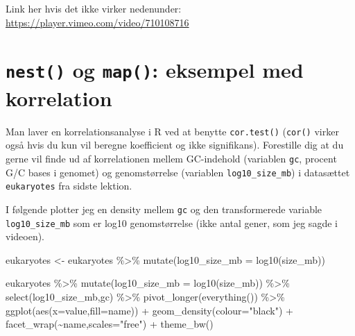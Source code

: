 \documentclass[
]{book}
\newenvironment{Shaded}{\begin{snugshade}}{\end{snugshade}}
\newcommand{\AttributeTok}[1]{\textcolor[rgb]{0.77,0.63,0.00}{#1}}
\newcommand{\FunctionTok}[1]{\textcolor[rgb]{0.00,0.00,0.00}{#1}}
\newcommand{\NormalTok}[1]{#1}
\newcommand{\OtherTok}[1]{\textcolor[rgb]{0.56,0.35,0.01}{#1}}
\newcommand{\SpecialCharTok}[1]{\textcolor[rgb]{0.00,0.00,0.00}{#1}}
\newcommand{\StringTok}[1]{\textcolor[rgb]{0.31,0.60,0.02}{#1}}
\begin{document}
Link her hvis det ikke virker nedenunder: \url{https://player.vimeo.com/video/710108716}

\hypertarget{nest-og-map-eksempel-med-korrelation}{%
\section{\texorpdfstring{\texttt{nest()} og \texttt{map()}: eksempel med korrelation}{nest() og map(): eksempel med korrelation}}\label{nest-og-map-eksempel-med-korrelation}}

Man laver en korrelationsanalyse i R ved at benytte \texttt{cor.test()} (\texttt{cor()} virker også hvis du kun vil beregne koefficient og ikke signifikans). Forestille dig at du gerne vil finde ud af korrelationen mellem GC-indehold (variablen \texttt{gc}, procent G/C bases i genomet) og genomstørrelse (variablen \texttt{log10\_size\_mb}) i datasættet \texttt{eukaryotes} fra sidste lektion.

I følgende plotter jeg en density mellem \texttt{gc} og den transformerede variable \texttt{log10\_size\_mb} som er log10 genomstørrelse (ikke antal gener, som jeg sagde i videoen).

\begin{Shaded}
\begin{Highlighting}[]
\NormalTok{eukaryotes }\OtherTok{\textless{}{-}}\NormalTok{ eukaryotes }\SpecialCharTok{\%\textgreater{}\%} 
  \FunctionTok{mutate}\NormalTok{(}\AttributeTok{log10\_size\_mb =} \FunctionTok{log10}\NormalTok{(size\_mb))}
\end{Highlighting}
\end{Shaded}

\begin{Shaded}
\begin{Highlighting}[]
\NormalTok{eukaryotes }\SpecialCharTok{\%\textgreater{}\%} 
  \FunctionTok{mutate}\NormalTok{(}\AttributeTok{log10\_size\_mb =} \FunctionTok{log10}\NormalTok{(size\_mb)) }\SpecialCharTok{\%\textgreater{}\%}
  \FunctionTok{select}\NormalTok{(log10\_size\_mb,gc) }\SpecialCharTok{\%\textgreater{}\%} 
  \FunctionTok{pivot\_longer}\NormalTok{(}\FunctionTok{everything}\NormalTok{()) }\SpecialCharTok{\%\textgreater{}\%}
  \FunctionTok{ggplot}\NormalTok{(}\FunctionTok{aes}\NormalTok{(}\AttributeTok{x=}\NormalTok{value,}\AttributeTok{fill=}\NormalTok{name)) }\SpecialCharTok{+} 
  \FunctionTok{geom\_density}\NormalTok{(}\AttributeTok{colour=}\StringTok{"black"}\NormalTok{) }\SpecialCharTok{+}
  \FunctionTok{facet\_wrap}\NormalTok{(}\SpecialCharTok{\textasciitilde{}}\NormalTok{name,}\AttributeTok{scales=}\StringTok{"free"}\NormalTok{) }\SpecialCharTok{+}
  \FunctionTok{theme\_bw}\NormalTok{()}
\end{Highlighting}
\end{Shaded}
\end{document}
